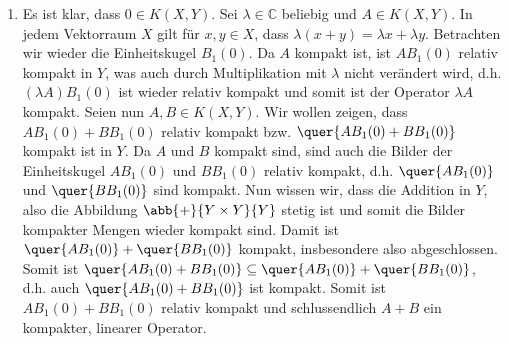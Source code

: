 \begin{exercisePage}
\begin{enumerate}[label=(zu \alph*), leftmargin=\zulength]
	\item Es ist klar, dass $0 \in K(X,Y)$. 
	Sei $\lambda \in \mathbb{C}$ beliebig und $A \in K(X,Y)$. In jedem Vektorraum $X$ gilt für $x,y \in X$, dass $\lambda (x+y) = \lambda x + \lambda y$. Betrachten wir wieder die Einheitskugel $B_1(0)$. Da $A$ kompakt ist, ist $A B_1(0)$ relativ kompakt in $Y$, was auch durch Multiplikation mit $\lambda$ nicht verändert wird, d.h. $(\lambda A) B_1(0)$ ist wieder relativ kompakt und somit ist der Operator $\lambda A$ kompakt.
	Seien nun $A,B \in K(X,Y)$. Wir wollen zeigen, dass $A B_1(0) + B B_1(0)$ relativ kompakt bzw. $\quer{A B_1(0) + B B_1(0)}$ kompakt ist in $Y$. Da $A$ und $B$ kompakt sind, sind auch die Bilder der Einheitskugel $A B_1(0)$ und $B B_1(0)$ relativ kompakt, d.h. $\quer{A B_1(0)}$ und $\quer{B B_1(0)}$ sind kompakt. Nun wissen wir, dass die Addition in $Y$, also die Abbildung $\abb{+}{Y \times Y}{Y}$ stetig ist und somit die Bilder kompakter Mengen wieder kompakt sind. Damit ist $\quer{A B_1(0)} + \quer{B B_1(0)}$ kompakt, insbesondere also abgeschlossen. Somit ist $\quer{A B_1(0) + B B_1(0)} \subseteq \quer{A B_1(0)} + \quer{B B_1(0)}$, d.h. auch $\quer{A B_1(0) + B B_1(0)}$ ist kompakt. Somit ist $A B_1(0) + B B_1(0)$ relativ kompakt und schlussendlich $A + B$ ein kompakter, linearer Operator.
	

\end{enumerate}
\end{exercisePage}
